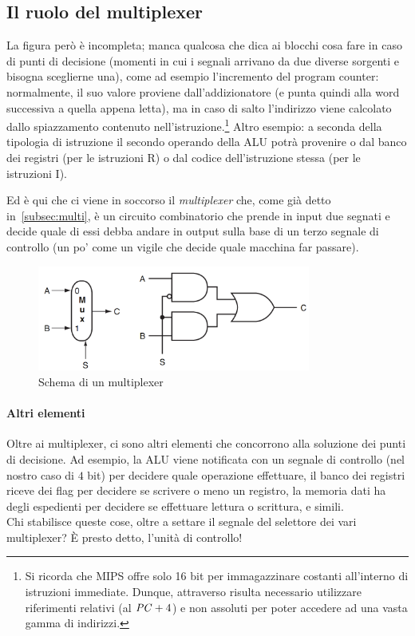 \documentclass[class=book, crop=false, oneside]{standalone}
\begin{document}
\subsection{Il ruolo del multiplexer}
La  figura però è incompleta; manca qualcosa che dica ai blocchi cosa fare in caso di punti di decisione (momenti in cui i segnali arrivano da due diverse sorgenti e bisogna sceglierne una), come ad esempio l'incremento del program counter: normalmente, il suo valore proviene dall'addizionatore (e punta quindi alla word successiva a quella appena letta), ma in caso di salto l'indirizzo viene calcolato dallo spiazzamento contenuto nell'istruzione.\footnote{Si ricorda che MIPS offre  solo 16 bit per immagazzinare costanti all'interno di istruzioni immediate. Dunque, attraverso  risulta necessario utilizzare riferimenti relativi (al \(\textrm{\emph{PC}}+4\)) e non assoluti per poter accedere ad una vasta gamma di indirizzi.} Altro esempio: a seconda della tipologia di istruzione il secondo operando della ALU potrà provenire o dal banco dei registri (per le istruzioni R) o dal codice dell'istruzione stessa (per le istruzioni I).

Ed è qui che ci viene in soccorso il \emph{multiplexer} che, come già detto in~\ref{subsec:multi}, è un circuito combinatorio che prende in input due segnati e decide quale di essi debba andare in output sulla base di un terzo segnale di controllo (un po' come un vigile che decide quale macchina far passare).
\begin{figure}[H]
	\centering
	\includegraphics[width=0.8\textwidth,keepaspectratio]{multi}
	\caption{Schema di un multiplexer}
\end{figure}
\paragraph{Altri elementi}
Oltre ai multiplexer, ci sono altri elementi che concorrono alla soluzione dei punti di decisione. Ad esempio, la ALU viene notificata con un segnale di controllo (nel nostro caso di \(4\) bit) per decidere quale operazione effettuare, il banco dei registri riceve dei flag per decidere se scrivere o meno un registro, la memoria dati ha degli espedienti per decidere se effettuare lettura o scrittura, e simili.\\
Chi stabilisce queste cose, oltre a settare il segnale del selettore dei vari multiplexer? È presto detto, l’unità di controllo!\\
\end{document}
